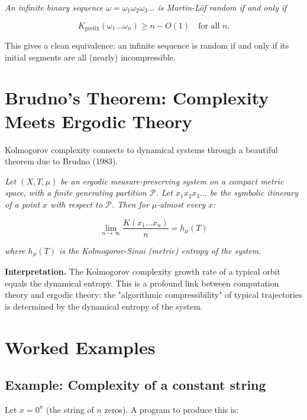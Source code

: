 \begin{theorem}
\textit{An infinite binary sequence $\omega = \omega_1 \omega_2 \omega_3 \ldots$ is Martin-Löf random if and only if}

\[K_{\text{prefix}}(\omega_1 \ldots \omega_n) \geq n - O(1) \quad \text{for all } n.\]

This gives a clean equivalence: an infinite sequence is random if and only if its initial segments are all (nearly) incompressible.
\end{theorem}



\section{Brudno's Theorem: Complexity Meets Ergodic Theory}

Kolmogorov complexity connects to dynamical systems through a beautiful theorem due to Brudno (1983).

\begin{theorem}[Brudno, 1983]
\textit{Let $(X, T, \mu)$ be an ergodic measure-preserving system on a compact metric space, with a finite generating partition $\mathcal{P}$. Let $x_1 x_2 x_3 \ldots$ be the symbolic itinerary of a point $x$ with respect to $\mathcal{P}$. Then for $\mu$-almost every $x$:}

\[\lim_{n \to \infty} \frac{K(x_1 \ldots x_n)}{n} = h_\mu(T)\]

\textit{where $h_\mu(T)$ is the Kolmogorov-Sinai (metric) entropy of the system.}

\textbf{Interpretation.} The Kolmogorov complexity growth rate of a typical orbit equals the dynamical entropy. This is a profound link between computation theory and ergodic theory: the "algorithmic compressibility" of typical trajectories is determined by the dynamical entropy of the system.
\end{theorem}



\section{Worked Examples}

\subsection*{Example: Complexity of a constant string}

Let $x = 0^n$ (the string of $n$ zeros). A program to produce this is:

